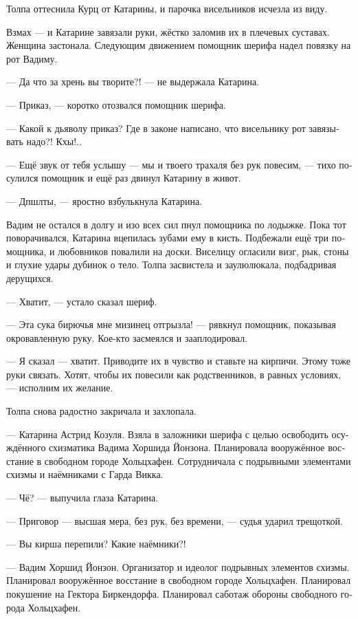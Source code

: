 \documentclass[a4paper,12pt,fleqn]{book}\usepackage{polyglossia}\setdefaultlanguage[babelshorthands=true]{russian}\setotherlanguage{english}\defaultfontfeatures{Ligatures=TeX,Mapping=tex-text}\usepackage{xcolor}\newcommand{\ml}[3]{#2}
\newcommand{\asterism}{\vspace{1em}{\centering\Large\bfseries$\ast~\ast~\ast$\par}\vspace{1em}}
\begin{document}
Толпа оттеснила Курц от Катарины, и парочка висельников исчезла из виду.

\asterism

Взмах --- и Катарине завязали руки, жёстко заломив их в плечевых суставах.
Женщина застонала.
Следующим движением помощник шерифа надел повязку на рот Вадиму.

--- Да что за хрень вы творите?! --- не выдержала Катарина.

--- Приказ, --- коротко отозвался помощник шерифа.

--- Какой к дьяволу приказ?
Где в законе написано, что висельнику рот завязывать надо?!
Кхы!..

--- Ещё звук от тебя услышу --- мы и твоего трахаля без рук повесим, --- тихо посулился помощник и ещё раз двинул Катарину в живот.

--- Дпшлты, --- яростно взбулькнула Катарина.

Вадим не остался в долгу и изо всех сил пнул помощника по лодыжке.
Пока тот поворачивался, Катарина вцепилась зубами ему в кисть.
Подбежали ещё три помощника, и любовников повалили на доски.
Виселицу огласили визг, рык, стоны и глухие удары дубинок о тело.
Толпа засвистела и заулюлюкала, подбадривая дерущихся.

--- Хватит, --- устало сказал шериф.

--- Эта сука бирючья мне мизинец отгрызла! --- рявкнул помощник, показывая окровавленную руку.
Кое-кто засмеялся и зааплодировал.

--- Я сказал --- хватит.
Приводите их в чувство и ставьте на кирпичи.
Этому тоже руки связать.
Хотят, чтобы их повесили как родственников, в равных условиях, --- исполним их желание.

Толпа снова радостно закричала и захлопала.

\asterism

--- Катарина Астрид Козуля.
Взяла в заложники шерифа с целью освободить осуждённого схизматика Вадима Хоршида Йонзона.
Планировала вооружённое восстание в свободном городе Хольцхафен.
Сотрудничала с подрывными элементами схизмы и наёмниками с Гарда Викка.

--- Чё? --- выпучила глаза Катарина.

--- Приговор --- высшая мера, без рук, без времени, --- судья ударил трещоткой.

--- Вы кирша перепили?
Какие наёмники?!

\ml{$0$}
{--- Вадим Хоршид Йонзон.}
{``Wadim Horschid Jonson.}
Организатор и идеолог подрывных элементов схизмы.
Планировал вооружённое восстание в свободном городе Хольцхафен.
Планировал покушение на Гектора Биркендорфа.
Планировал саботаж обороны свободного города Хольцхафен.
\end{document}
